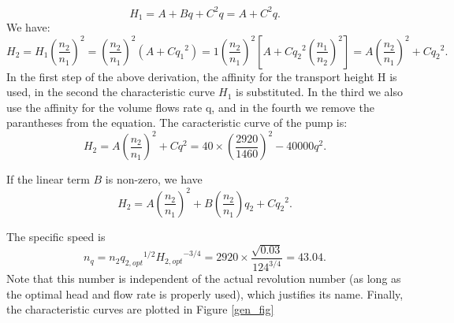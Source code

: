 \begin{tcolorbox}
\begin{equation*}
	H_1=A+Bq+C^2q=A+C^2q.
\end{equation*}
%
We have:
%
\begin{equation*}
	H_2=H_1\left(\frac{n_2}{n_1}\right)^2=\left(\frac{n_2}{n_1}\right)^2\left(A+C{q_1}^2\right)=1\left(\frac{n_2}{n_1}\right)^2\left[A+C{q_2}^2\left(\frac{n_1}{n_2}\right)^2\right]=A\left(\frac{n_2}{n_1}\right)^2+C{q_2}^2.
\end{equation*}
In the first step of the above derivation, the affinity for the transport height H is used, in the second the characteristic curve $H_1$ is substituted. In the third we also use the affinity for the volume flows rate q, and in the fourth we remove the parantheses from the equation. The caracteristic curve of the pump is:
%
\begin{equation*}
	H_2=A\left(\frac{n_2}{n_1}\right)^2+Cq^2=40\times\left(\frac{2920}{1460}\right)^2-40000q^2.
\end{equation*}

If the linear term $B$ is non-zero, we have
%
\begin{equation*}
	H_2=A\left(\frac{n_2}{n_1}\right)^2+B\left(\frac{n_2}{n_1}\right)q_2+C{q_2}^2.
\end{equation*}

The specific speed is
%
\begin{equation*}
	n_q=n_2 {q_{2,opt}}^{1/2}{H_{2,opt}}^{-3/4}=2920\times\frac{\sqrt{0.03}}{{124}^{3/4}}=43.04.
\end{equation*}
%
Note that this number is independent of the actual revolution number (as long as the optimal head and flow rate is properly used), which justifies its name. Finally, the characteristic curves are plotted in Figure \ref{gen_fig}

\end{tcolorbox}

